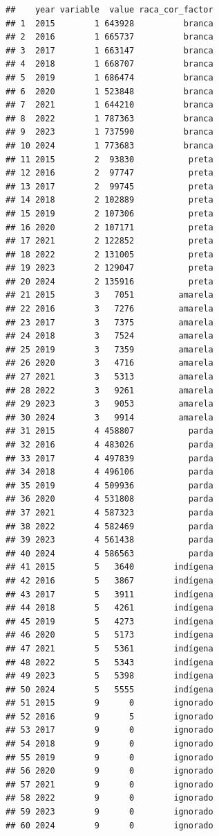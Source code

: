 \documentclass[
]{book}
\begin{document}
\begin{verbatim}
##    year variable  value raca_cor_factor
## 1  2015        1 643928          branca
## 2  2016        1 665737          branca
## 3  2017        1 663147          branca
## 4  2018        1 668707          branca
## 5  2019        1 686474          branca
## 6  2020        1 523848          branca
## 7  2021        1 644210          branca
## 8  2022        1 787363          branca
## 9  2023        1 737590          branca
## 10 2024        1 773683          branca
## 11 2015        2  93830           preta
## 12 2016        2  97747           preta
## 13 2017        2  99745           preta
## 14 2018        2 102889           preta
## 15 2019        2 107306           preta
## 16 2020        2 107171           preta
## 17 2021        2 122852           preta
## 18 2022        2 131005           preta
## 19 2023        2 129047           preta
## 20 2024        2 135916           preta
## 21 2015        3   7051         amarela
## 22 2016        3   7276         amarela
## 23 2017        3   7375         amarela
## 24 2018        3   7524         amarela
## 25 2019        3   7359         amarela
## 26 2020        3   4716         amarela
## 27 2021        3   5313         amarela
## 28 2022        3   9261         amarela
## 29 2023        3   9053         amarela
## 30 2024        3   9914         amarela
## 31 2015        4 458807           parda
## 32 2016        4 483026           parda
## 33 2017        4 497839           parda
## 34 2018        4 496106           parda
## 35 2019        4 509936           parda
## 36 2020        4 531808           parda
## 37 2021        4 587323           parda
## 38 2022        4 582469           parda
## 39 2023        4 561438           parda
## 40 2024        4 586563           parda
## 41 2015        5   3640        indígena
## 42 2016        5   3867        indígena
## 43 2017        5   3911        indígena
## 44 2018        5   4261        indígena
## 45 2019        5   4273        indígena
## 46 2020        5   5173        indígena
## 47 2021        5   5361        indígena
## 48 2022        5   5343        indígena
## 49 2023        5   5398        indígena
## 50 2024        5   5555        indígena
## 51 2015        9      0        ignorado
## 52 2016        9      5        ignorado
## 53 2017        9      0        ignorado
## 54 2018        9      0        ignorado
## 55 2019        9      0        ignorado
## 56 2020        9      0        ignorado
## 57 2021        9      0        ignorado
## 58 2022        9      0        ignorado
## 59 2023        9      0        ignorado
## 60 2024        9      0        ignorado
\end{verbatim}
\end{document}
